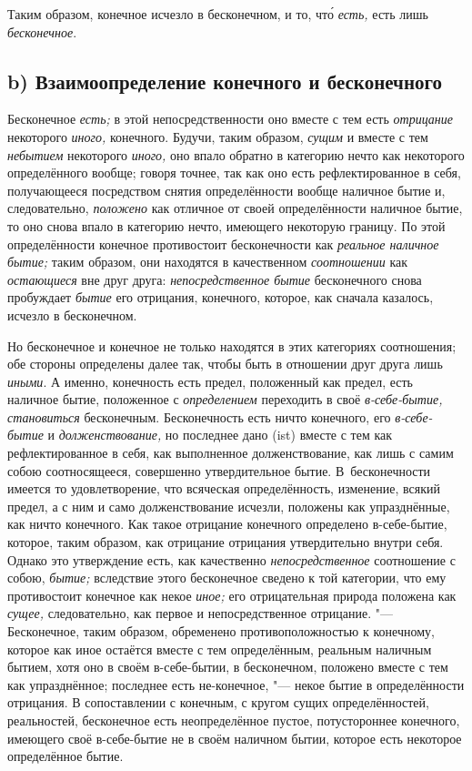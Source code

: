 Таким образом, конечное исчезло в бесконечном,
и то, чт\'{о} {\em есть,} есть лишь {\em бесконечное}.

\subsection[b) Взаимоопределение конечного и бесконечного]%
{b) Взаимоопределение конечного и бесконечного}

Бесконечное {\em есть;} в этой непосредственности оно
вместе с тем есть {\em отрицание} некоторого
{\em иного,} конечного. Будучи, таким образом,
{\em сущим} и вместе с тем {\em небытием} некоторого
{\em иного,} оно впало обратно в категорию нечто как
некоторого определённого вообще; говоря точнее, так как оно есть
рефлектированное в себя, получающееся посредством снятия определённости
вообще наличное бытие и, следовательно, {\em положено}
как отличное от своей определённости наличное бытие, то оно снова впало в
категорию нечто, имеющего некоторую границу. По этой определённости
конечное противостоит бесконечности как {\em реальное
наличное бытие;} таким образом, они находятся в качественном
{\em соотношении} как
{\em остающиеся} вне друг друга:
{\em непосредственное бытие} бесконечного снова
пробуждает {\em бытие} его отрицания, конечного,
которое, как сначала казалось, исчезло в бесконечном.

Но бесконечное и конечное не только находятся в этих категориях соотношения;
обе стороны определены далее так, чтобы быть в отношении друг друга лишь
{\em иными}. А именно, конечность есть предел,
положенный как предел, есть наличное бытие, положенное с
{\em определением} переходить в своё
{\em в-себе-бытие,}
{\em становиться} бесконечным. Бесконечность есть ничто
конечного, его {\em в-себе-бытие} и
{\em долженствование,} но последнее дано (ist) вместе с
тем как рефлектированное в себя, как выполненное долженствование, как лишь
с самим собою соотносящееся, совершенно утвердительное бытие.
В~бесконечности имеется то удовлетворение, что всяческая определённость,
изменение, всякий предел, а с ним и само долженствование исчезли, положены
как упразднённые, как ничто конечного. Как такое отрицание конечного
определено в-себе-бытие, которое, таким образом, как отрицание отрицания
утвердительно внутри себя. Однако это утверждение есть, как качественно
{\em непосредственное} соотношение с собою,
{\em бытие;} вследствие этого бесконечное сведено к той
категории, что ему противостоит конечное как некое
{\em иное;} его отрицательная природа положена как
{\em сущее,} следовательно, как первое и
непосредственное отрицание. "--- Бесконечное, таким образом, обременено
противоположностью к конечному, которое как иное остаётся вместе с тем
определённым, реальным наличным бытием, хотя оно в своём в-себе-бытии, в
бесконечном, положено вместе с тем как упразднённое; последнее есть
не-конечное, "--- некое бытие в определённости отрицания. В сопоставлении с
конечным, с кругом сущих определённостей, реальностей, бесконечное есть
неопределённое пустое, потустороннее конечного, имеющего своё в-себе-бытие
не в своём наличном бытии, которое есть некоторое определённое бытие.

